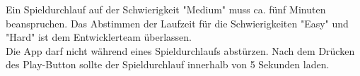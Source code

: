 Ein Spieldurchlauf auf der Schwierigkeit "Medium" \gls{muss} ca. fünf Minuten beanspruchen. Das Abstimmen der Laufzeit für die Schwierigkeiten "Easy" und "Hard" ist dem Entwicklerteam überlassen.
\\
Die App darf nicht während eines Spieldurchlaufs abstürzen. Nach dem Drücken des Play-Button \gls{sollte} der Spieldurchlauf innerhalb von 5 Sekunden laden.
